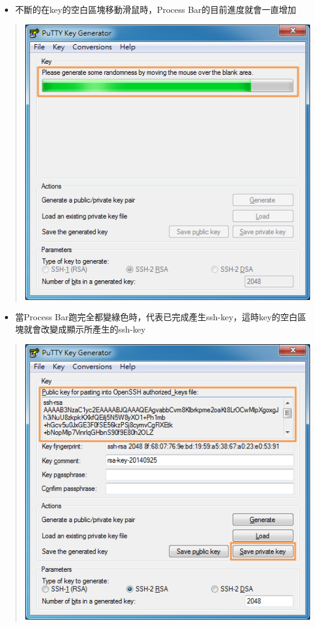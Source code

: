\documentclass[letterpaper,10pt,english]{sphinxmanual}
\begin{document}
\begin{itemize}
\item {} 
不斷的在key的空白區塊移動滑鼠時，Process Bar的目前進度就會一直增加

\end{itemize}
\begin{quote}

\includegraphics{puttygen-004.png}
\end{quote}
\begin{itemize}
\item {} 
當Process Bar跑完全都變綠色時，代表已完成產生ssh-key，這時key的空白區塊就會改變成顯示所產生的ssh-key

\end{itemize}
\begin{quote}

\includegraphics{puttygen-005.png}
\end{quote}
\end{document}
